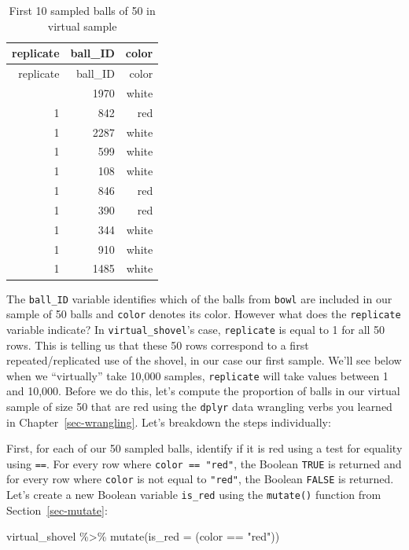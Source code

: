 \documentclass[
  letterpaper,
  DIV=11,
  numbers=noendperiod]{scrreprt}
\newenvironment{Shaded}{\begin{snugshade}}{\end{snugshade}}
\newcommand{\AttributeTok}[1]{\textcolor[rgb]{0.40,0.45,0.13}{#1}}
\newcommand{\FunctionTok}[1]{\textcolor[rgb]{0.28,0.35,0.67}{#1}}
\newcommand{\NormalTok}[1]{\textcolor[rgb]{0.00,0.23,0.31}{#1}}
\newcommand{\SpecialCharTok}[1]{\textcolor[rgb]{0.37,0.37,0.37}{#1}}
\newcommand{\StringTok}[1]{\textcolor[rgb]{0.13,0.47,0.30}{#1}}
\theoremstyle{definition}
\theoremstyle{remark}
\begin{document}
\hypertarget{tbl-virtual-shovel}{}
\begin{longtable}[]{@{}rrr@{}}
\caption{\label{tbl-virtual-shovel}First 10 sampled balls of 50 in
virtual sample}\tabularnewline
\toprule\noalign{}
replicate & ball\_ID & color \\
\midrule\noalign{}
\endfirsthead
\toprule\noalign{}
replicate & ball\_ID & color \\
\midrule\noalign{}
\endhead
\bottomrule\noalign{}
\endlastfoot
1 & 1970 & white \\
1 & 842 & red \\
1 & 2287 & white \\
1 & 599 & white \\
1 & 108 & white \\
1 & 846 & red \\
1 & 390 & red \\
1 & 344 & white \\
1 & 910 & white \\
1 & 1485 & white \\
\end{longtable}

The \texttt{ball\_ID} variable identifies which of the balls from
\texttt{bowl} are included in our sample of 50 balls and \texttt{color}
denotes its color. However what does the \texttt{replicate} variable
indicate? In \texttt{virtual\_shovel}'s case, \texttt{replicate} is
equal to 1 for all 50 rows. This is telling us that these 50 rows
correspond to a first repeated/replicated use of the shovel, in our case
our first sample. We'll see below when we ``virtually'' take 10,000
samples, \texttt{replicate} will take values between 1 and 10,000.
Before we do this, let's compute the proportion of balls in our virtual
sample of size 50 that are red using the \texttt{dplyr} data wrangling
verbs you learned in Chapter~\ref{sec-wrangling}. Let's breakdown the
steps individually:

First, for each of our 50 sampled balls, identify if it is red using a
test for equality using \texttt{==}. For every row where
\texttt{color\ ==\ "red"}, the Boolean \texttt{TRUE} is returned and for
every row where \texttt{color} is not equal to \texttt{"red"}, the
Boolean \texttt{FALSE} is returned. Let's create a new Boolean variable
\texttt{is\_red} using the \texttt{mutate()} function from
Section~\ref{sec-mutate}:

\begin{Shaded}
\begin{Highlighting}[]
\NormalTok{virtual\_shovel }\SpecialCharTok{\%\textgreater{}\%} 
  \FunctionTok{mutate}\NormalTok{(}\AttributeTok{is\_red =}\NormalTok{ (color }\SpecialCharTok{==} \StringTok{"red"}\NormalTok{))}
\end{Highlighting}
\end{Shaded}
\end{document}
